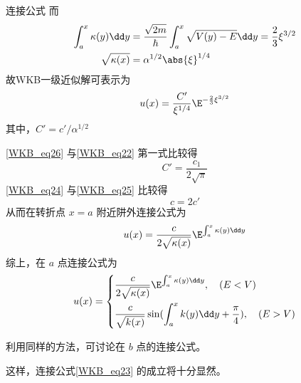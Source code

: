 \begin{example}{连接公式}
而
\begin{equation}
\begin{aligned}
\int_a^x\kappa(y)\dd y&=
\frac{\sqrt{2m}}{\hbar}\int_a^x\sqrt{V(y)-E}\dd y=\frac{2}{3}\xi^{3/2}
\\
\sqrt{\kappa(x)}
&=
\alpha^{1/2}\abs{\xi}^{1/4}
\end{aligned}
\end{equation}
故WKB一级近似解可表示为
\begin{equation}\label{WKB_eq26}
u(x)=\frac{C'}{\xi^{1/4}}\E^{-\frac{2}{3}\xi^{3/2}}
\end{equation}
其中，$C'=c'/\alpha^{1/2}$

\autoref{WKB_eq26}  与\autoref{WKB_eq22} 第一式比较得
\begin{equation}\label{WKB_eq24}
C'=\frac{c_1}{2\sqrt{\pi}}
\end{equation}
\autoref{WKB_eq24} 与\autoref{WKB_eq25} 比较得
\begin{equation}
c=2c'
\end{equation}
从而在转折点 $x=a$ 附近阱外连接公式为
\begin{equation}
u(x)=\frac{c}{2\sqrt{\kappa(x)}}\E^{\int_a^x\kappa(y)\dd y}
\end{equation}
综上，在 $a$ 点连接公式为
\begin{equation}
u(x)=\left\{\begin{aligned}
&\frac{c}{2\sqrt{\kappa(x)}}\E^{\int_a^x\kappa(y)\dd y} ,\quad(E<V)\\
&\frac{c}{\sqrt{k(x)}}\sin(\int_a^x k(y)\dd y+\frac{\pi}{4}),\quad(E>V)
\end{aligned}\right.
\end{equation}

利用同样的方法，可讨论在 $b$ 点的连接公式。
\end{example}

这样，连接公式\autoref{WKB_eq23} 的成立将十分显然。

